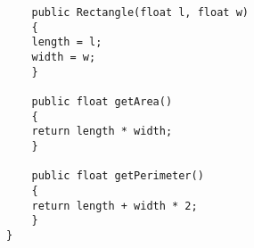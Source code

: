 \documentclass{article}
\begin{document}
\begin{itemize}
\begin{lstlisting}
                public Rectangle(float l, float w)
                {
                length = l;
                width = w;
                }
                
                public float getArea()
                {
                return length * width;
                }
                
                public float getPerimeter()
                {
                return length + width * 2;
                }
            }

    \end{lstlisting}
\end{itemize}
\end{document}
